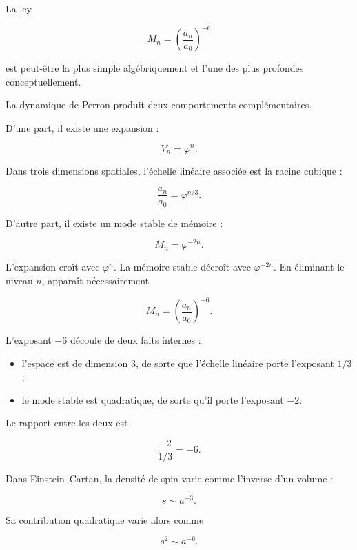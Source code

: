 La ley\par

\[
M_n
=
\left(\frac{a_n}{a_0}\right)^{-6}
\]

est peut-être la plus simple algébriquement et l’une des plus profondes conceptuellement.\par

La dynamique de Perron produit deux comportements complémentaires.\par

D’une part, il existe une expansion :\par

\[
V_n=\varphi^n.
\]

Dans trois dimensions spatiales, l’échelle linéaire associée est la racine cubique :\par

\[
\frac{a_n}{a_0}
=
\varphi^{n/3}.
\]

D’autre part, il existe un mode stable de mémoire :\par

\[
M_n=\varphi^{-2n}.
\]

L’expansion croît avec \(\varphi^n\). La mémoire stable décroît avec \(\varphi^{-2n}\). En éliminant le niveau \(n\), apparaît nécessairement\par

\[
M_n
=
\left(\frac{a_n}{a_0}\right)^{-6}.
\]

L’exposant \(-6\) découle de deux faits internes :\par

\begin{itemize}[leftmargin=*,itemsep=0.35em]
\item l’espace est de dimension \(3\), de sorte que l’échelle linéaire porte l’exposant \(1/3\) ;
\item le mode stable est quadratique, de sorte qu’il porte l’exposant \(-2\).
\end{itemize}

Le rapport entre les deux est\par

\[
\frac{-2}{1/3}=-6.
\]

Dans Einstein–Cartan, la densité de spin varie comme l’inverse d’un volume :\par

\[
s\sim a^{-3}.
\]

Sa contribution quadratique varie alors comme\par

\[
s^2\sim a^{-6}.
\]

